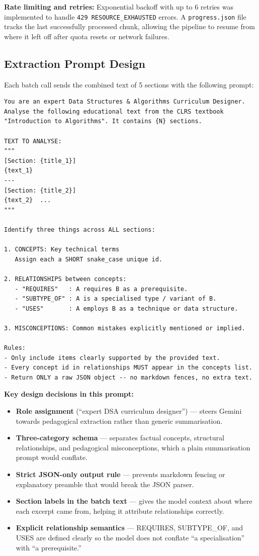 \documentclass[12pt,a4paper]{article}
\begin{document}
\textbf{Rate limiting and retries:} Exponential backoff with up to 6 retries
was implemented to handle \texttt{429 RESOURCE\_EXHAUSTED} errors. A
\texttt{progress.json} file tracks the last successfully processed chunk,
allowing the pipeline to resume from where it left off after quota resets or
network failures.

\subsection{Extraction Prompt Design}

Each batch call sends the combined text of 5 sections with the following prompt:

\begin{lstlisting}
You are an expert Data Structures & Algorithms Curriculum Designer.
Analyse the following educational text from the CLRS textbook
"Introduction to Algorithms". It contains {N} sections.

TEXT TO ANALYSE:
"""
[Section: {title_1}]
{text_1}
---
[Section: {title_2}]
{text_2}  ...
"""

Identify three things across ALL sections:

1. CONCEPTS: Key technical terms
   Assign each a SHORT snake_case unique id.

2. RELATIONSHIPS between concepts:
   - "REQUIRES"   : A requires B as a prerequisite.
   - "SUBTYPE_OF" : A is a specialised type / variant of B.
   - "USES"       : A employs B as a technique or data structure.

3. MISCONCEPTIONS: Common mistakes explicitly mentioned or implied.

Rules:
- Only include items clearly supported by the provided text.
- Every concept id in relationships MUST appear in the concepts list.
- Return ONLY a raw JSON object -- no markdown fences, no extra text.
\end{lstlisting}

\textbf{Key design decisions in this prompt:}

\begin{itemize}
  \item \textbf{Role assignment} (``expert DSA curriculum designer'') --- steers
    Gemini towards pedagogical extraction rather than generic summarisation.
  \item \textbf{Three-category schema} --- separates factual concepts, structural
    relationships, and pedagogical misconceptions, which a plain summarisation
    prompt would conflate.
  \item \textbf{Strict JSON-only output rule} --- prevents markdown fencing or
    explanatory preamble that would break the JSON parser.
  \item \textbf{Section labels in the batch text} --- gives the model context
    about where each excerpt came from, helping it attribute relationships
    correctly.
  \item \textbf{Explicit relationship semantics} --- REQUIRES, SUBTYPE\_OF, and
    USES are defined clearly so the model does not conflate ``a specialisation''
    with ``a prerequisite.''
\end{itemize}
\end{document}
